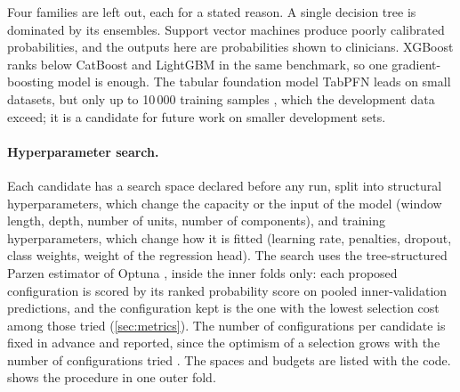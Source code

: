Four families are left out, each for a stated reason. A single decision tree is dominated by its ensembles. Support vector machines produce poorly calibrated probabilities, and the outputs here are probabilities shown to clinicians. XGBoost ranks below CatBoost and LightGBM in the same benchmark, so one gradient-boosting model is enough. The tabular foundation model TabPFN leads on small datasets, but only up to 10\,000 training samples \parencite{hollmann2025,erickson2025}, which the development data exceed; it is a candidate for future work on smaller development sets.

\paragraph{Hyperparameter search.} Each candidate has a search space declared before any run, split into structural hyperparameters, which change the capacity or the input of the model (window length, depth, number of units, number of components), and training hyperparameters, which change how it is fitted (learning rate, penalties, dropout, class weights, weight of the regression head). The search uses the tree-structured Parzen estimator of Optuna \parencite{bergstra2011,akiba2019}, inside the inner folds only: each proposed configuration is scored by its ranked probability score on pooled inner-validation predictions, and the configuration kept is the one with the lowest selection cost among those tried (\cref{sec:metrics}). The number of configurations per candidate is fixed in advance and reported, since the optimism of a selection grows with the number of configurations tried \parencite{cawley2010}. The spaces and budgets are listed with the code.  shows the procedure in one outer fold.

